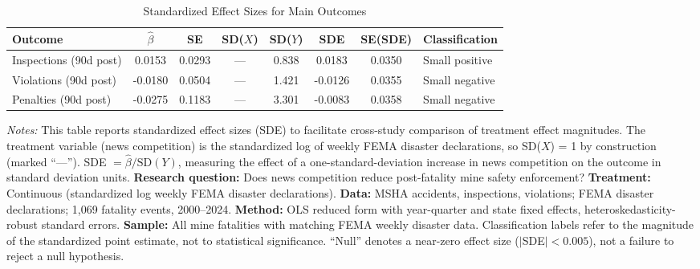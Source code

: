 \begin{table}[H]
\centering
\caption{Standardized Effect Sizes for Main Outcomes}
\label{tab:sde}
\begin{adjustbox}{max width=\textwidth}
\begin{tabular}{lccccccl}
\toprule
Outcome & $\hat{\beta}$ & SE & SD($X$) & SD($Y$) & SDE & SE(SDE) & Classification \\
\midrule
Inspections (90d post) & 0.0153 & 0.0293 & --- & 0.838 & 0.0183 & 0.0350 & Small positive \\
Violations (90d post) & -0.0180 & 0.0504 & --- & 1.421 & -0.0126 & 0.0355 & Small negative \\
Penalties (90d post) & -0.0275 & 0.1183 & --- & 3.301 & -0.0083 & 0.0358 & Small negative \\
\bottomrule
\end{tabular}
\end{adjustbox}
\par\vspace{0.3em}
{\footnotesize \emph{Notes:} This table reports standardized effect sizes (SDE) to facilitate cross-study comparison of treatment effect magnitudes. The treatment variable (news competition) is the standardized log of weekly FEMA disaster declarations, so SD($X$) = 1 by construction (marked ``---''). SDE $= \hat{\beta} / \text{SD}(Y)$, measuring the effect of a one-standard-deviation increase in news competition on the outcome in standard deviation units. \textbf{Research question:} Does news competition reduce post-fatality mine safety enforcement? \textbf{Treatment:} Continuous (standardized log weekly FEMA disaster declarations). \textbf{Data:} MSHA accidents, inspections, violations; FEMA disaster declarations; 1,069 fatality events, 2000--2024. \textbf{Method:} OLS reduced form with year-quarter and state fixed effects, heteroskedasticity-robust standard errors. \textbf{Sample:} All mine fatalities with matching FEMA weekly disaster data. Classification labels refer to the magnitude of the standardized point estimate, not to statistical significance. ``Null'' denotes a near-zero effect size ($|$SDE$| < 0.005$), not a failure to reject a null hypothesis.}
\end{table}

